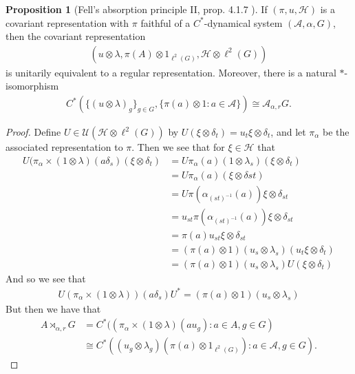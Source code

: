 \documentclass[10pt,oneside,openany,final]{memoir}
\theoremstyle{definition}
\newtheorem{proposition}[theorem]{Proposition}
\theoremstyle{Break}
\newcommand{\A}{\mathcal{A}}
\renewcommand{\H}{\mathcal{H}}
\begin{document}
\begin{proposition}[Fell's absorption principle II, prop. 4.1.7 \text{[BO]}]
If $(\pi,u,\H)$ is a covariant representation with $\pi$ faithful of a $C^*$-dynamical system $(\A,\alpha,G)$, then the covariant representation
\begin{align*}
(u \otimes \lambda, \pi(A) \otimes 1_{\ell^2(G)}, \H \otimes \ell^2(G))
\end{align*}
is unitarily equivalent to a regular representation. Moreover, there is a natural $*$-isomorphism
\begin{align*}
	C^*(\{(u \otimes \lambda)_{g}\}_{g \in G}, \{\pi(a)\otimes 1 \colon a \in \A\}) \cong \A_{\alpha,r}G.
\end{align*}
\begin{proof}
Define $U \in \mathcal{U}(\H \otimes \ell^2(G))$ by $U(\xi \otimes \delta_{t})=u_{t}\xi \otimes \delta_{t}$, and let $\pi_{\alpha}$ be the associated representation to $\pi$. Then we see that for $\xi \in \H$ that
\begin{align*}
U (\pi_{\alpha} \times (1 \otimes \lambda)(a \delta_{s}) (\xi \otimes \delta_{t})&= U \pi_{\alpha}(a)(1 \otimes \lambda_{s})(\xi \otimes \delta_{t})\\
&= U \pi_{\alpha}(a) (\xi \otimes \delta st)\\
&= U \pi(\alpha_{(st)^{-1}}(a))\xi \otimes \delta_{st}\\
&= u_{st} \pi(\alpha_{(st)^{-1}}(a))\xi \otimes \delta_{st}\\
&= \pi(a)u_{st} \xi \otimes \delta_{st}\\
&=(\pi(a)\otimes 1)(u_{s} \otimes \lambda_{s})(u_{t}\xi \otimes \delta_{t})\\
&= (\pi(a)\otimes 1)(u_{s} \otimes \lambda_{s})U(\xi \otimes \delta_{t})
\end{align*}
And so we see that
\begin{align*}
U (\pi_{\alpha} \times (1 \otimes \lambda))(a \delta_{s})U^*=(\pi(a)\otimes 1)(u_{s} \otimes \lambda_{s})
\end{align*}
But then we have that
\begin{align*}
A \rtimes_{\alpha,r} G &=C^*((\pi_{\alpha}\times(1 \otimes \lambda)(a u_{g}) \colon a \in A, g \in G )\\ 
&\cong C^*((u_{g} \otimes \lambda_{g}) ( \pi(a) \otimes 1_{\ell^2(G)}) \colon a \in \A , g \in G).
\end{align*}
\end{proof}
\end{proposition}
\end{document}
